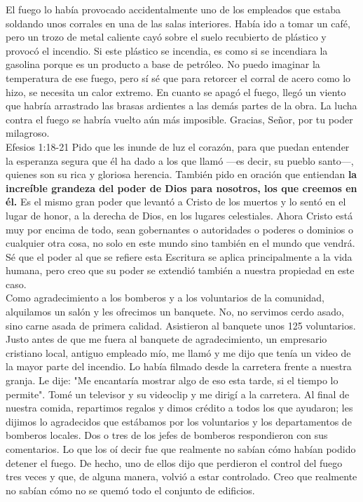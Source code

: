 \documentclass[twoside, 12pt]{book}
\begin{document}
El fuego lo había provocado accidentalmente uno de los empleados que estaba soldando unos corrales en una de las salas interiores. Había ido a tomar un café, pero un trozo de metal caliente cayó sobre el suelo recubierto de plástico y provocó el incendio. Si este plástico se incendia, es como si se incendiara la gasolina porque es un producto a base de petróleo. No puedo imaginar la temperatura de ese fuego, pero sí sé que para retorcer el corral de acero como lo hizo, se necesita un calor extremo. En cuanto se apagó el fuego, llegó un viento que habría arrastrado las brasas ardientes a las demás partes de la obra. La lucha contra el fuego se habría vuelto aún más imposible. Gracias, Señor, por tu poder milagroso.\\

Efesios 1:18-21 Pido que les inunde de luz el corazón, para que puedan entender la esperanza segura que él ha dado a los que llamó —es decir, su pueblo santo—, quienes son su rica y gloriosa herencia. También pido en oración que entiendan \textbf{la increíble grandeza del poder de Dios para nosotros, los que creemos en él.} Es el mismo gran poder que levantó a Cristo de los muertos y lo sentó en el lugar de honor, a la derecha de Dios, en los lugares celestiales. Ahora Cristo está muy por encima de todo, sean gobernantes o autoridades o poderes o dominios o cualquier otra cosa, no solo en este mundo sino también en el mundo que vendrá. Sé que el poder al que se refiere esta Escritura se aplica principalmente a la vida humana, pero creo que su poder se extendió también a nuestra propiedad en este caso.\\

Como agradecimiento a los bomberos y a los voluntarios de la comunidad, alquilamos un salón y les ofrecimos un banquete. No, no servimos cerdo asado, sino carne asada de primera calidad. Asistieron al banquete unos 125 voluntarios. Justo antes de que me fuera al banquete de agradecimiento, un empresario cristiano local, antiguo empleado mío, me llamó y me dijo que tenía un video de la mayor parte del incendio. Lo había filmado desde la carretera frente a nuestra granja. Le dije: "Me encantaría mostrar algo de eso esta tarde, si el tiempo lo permite". Tomé un televisor y su videoclip y me dirigí a la carretera. Al final de nuestra comida, repartimos regalos y dimos crédito a todos los que ayudaron; les dijimos lo agradecidos que estábamos por los voluntarios y los departamentos de bomberos locales. Dos o tres de los jefes de bomberos respondieron con sus comentarios. Lo que los oí decir fue que realmente no sabían cómo habían podido detener el fuego. De hecho, uno de ellos dijo que perdieron el control del fuego tres veces y que, de alguna manera, volvió a estar controlado. Creo que realmente no sabían cómo no se quemó todo el conjunto de edificios.\\
\end{document}
